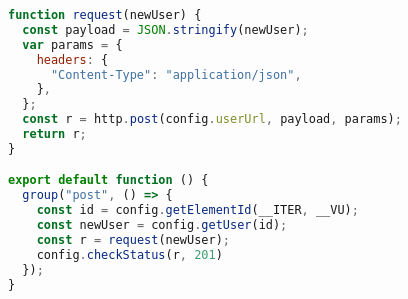 \begin{lstlisting}[language=JavaScript,caption={K6 Post test},breaklines=true,label={lst:k6Post}]
function request(newUser) {
  const payload = JSON.stringify(newUser);
  var params = {
    headers: {
      "Content-Type": "application/json",
    },
  };
  const r = http.post(config.userUrl, payload, params);
  return r;
}

export default function () {
  group("post", () => {
    const id = config.getElementId(__ITER, __VU);
    const newUser = config.getUser(id);
    const r = request(newUser);
    config.checkStatus(r, 201)
  });
}
\end{lstlisting}
